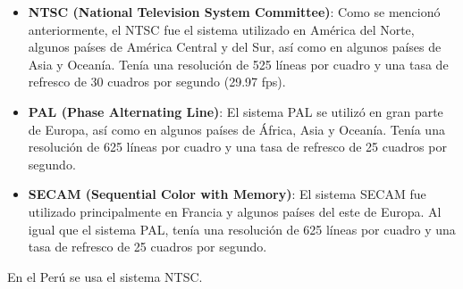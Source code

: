 \documentclass[
	12pt, %
	fleqn, %
	a4paper, %
	oneside, %
]{LegrandOrangeBook}
\begin{document}
\begin{itemize}
\item \textbf{NTSC (National Television System Committee)}: Como se mencionó anteriormente, el NTSC fue el sistema utilizado en América del Norte, algunos países de América Central y del Sur, así como en algunos países de Asia y Oceanía. Tenía una resolución de 525 líneas por cuadro y una tasa de refresco de 30 cuadros por segundo (29.97 fps).

\item \textbf{PAL (Phase Alternating Line)}: El sistema PAL se utilizó en gran parte de Europa, así como en algunos países de África, Asia y Oceanía. Tenía una resolución de 625 líneas por cuadro y una tasa de refresco de 25 cuadros por segundo.

\item \textbf{SECAM (Sequential Color with Memory)}: El sistema SECAM fue utilizado principalmente en Francia y algunos países del este de Europa. Al igual que el sistema PAL, tenía una resolución de 625 líneas por cuadro y una tasa de refresco de 25 cuadros por segundo.
\end{itemize}
\begin{remark}
En el Perú se usa el sistema NTSC.
\end{remark}
\end{document}
